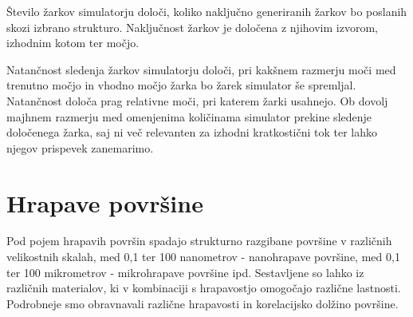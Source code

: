 \documentclass[a4paper,twoside,openright,12pt,slovene]{book}
\begin{document}
Število žarkov simulatorju določi, koliko naključno generiranih žarkov bo poslanih skozi izbrano strukturo. Naključnost žarkov je določena z njihovim izvorom, izhodnim kotom ter močjo.

Natančnost sledenja žarkov simulatorju določi, pri kakšnem razmerju moči med trenutno močjo in vhodno močjo žarka bo žarek simulator še spremljal. Natančnost določa prag relativne moči, pri katerem žarki usahnejo. Ob dovolj majhnem razmerju med omenjenima količinama simulator prekine sledenje določenega žarka, saj ni več relevanten za izhodni kratkostični tok ter lahko njegov prispevek zanemarimo. \cite{SOM}


\section{Hrapave površine}
\label{nanoPov}
Pod pojem hrapavih površin spadajo strukturno razgibane površine v različnih velikostnih skalah, med 0,1 ter 100 nanometrov - nanohrapave površine, med 0,1 ter 100 mikrometrov - mikrohrapave površine ipd. Sestavljene so lahko iz različnih materialov, ki v kombinaciji s hrapavostjo omogočajo različne lastnosti. Podrobneje smo obravnavali različne hrapavosti in korelacijsko dolžino površine.
\end{document}
